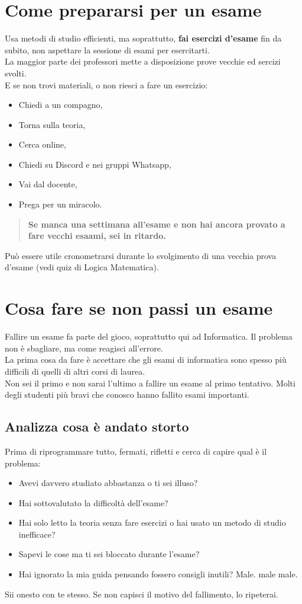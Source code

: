 \documentclass[18pt]{extarticle}
\begin{document}
\section{Come prepararsi per un esame}
Usa metodi di studio efficienti, ma soprattutto, \textbf{fai esercizi d'esame} fin da subito, non aspettare la sessione di esami per esercitarti.\\
La maggior parte dei professori mette a disposizione prove vecchie ed sercizi svolti.\\
E se non trovi materiali, o non riesci a fare un esercizio:
\begin{itemize}
\item Chiedi a un compagno,
\item Torna sulla teoria,
\item Cerca online,
\item Chiedi su Discord e nei gruppi Whatsapp,
\item Vai dal docente,
\item Prega per un miracolo.
\end{itemize}
\begin{quote}
\textbf{Se manca una settimana all'esame e non hai ancora provato a fare vecchi esaami, sei in ritardo.}
\end{quote}
Può essere utile cronometrarsi durante lo svolgimento di una vecchia prova d'esame (vedi quiz di Logica Matematica).

\clearpage
\section{Cosa fare se non passi un esame}
Fallire un esame fa parte del gioco, soprattutto qui ad Informatica. Il problema non è sbagliare, ma come reagisci all'errore.\\
La prima cosa da fare è accettare che gli esami di informatica sono spesso più difficili di quelli di altri corsi di laurea.\\
Non sei il primo e non sarai l'ultimo a fallire un esame al primo tentativo.  
Molti degli studenti più bravi che conosco hanno fallito esami importanti.


\subsection{Analizza cosa è andato storto}
Prima di riprogrammare tutto, fermati, rifletti e cerca di capire qual è il problema:
\begin{itemize}
\item Avevi davvero studiato abbastanza o ti sei illuso?
\item Hai sottovalutato la difficoltà dell'esame?
\item Hai solo letto la teoria senza fare esercizi o hai usato un metodo di studio inefficace?
\item Sapevi le cose ma ti sei bloccato durante l'esame?
\item Hai ignorato la mia guida pensando fossero consigli inutili? Male. male male.
\end{itemize}
Sii onesto con te stesso. Se non capisci il motivo del fallimento, lo ripeterai.
\end{document}
